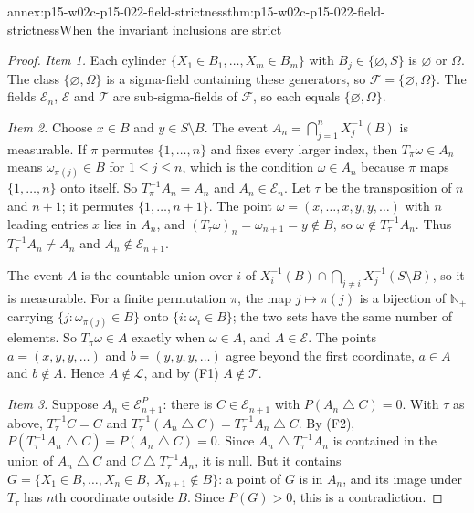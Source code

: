 \begin{annexitem}{annex:p15-w02c-p15-022-field-strictness}{thm:p15-w02c-p15-022-field-strictness}{When the invariant inclusions are strict}
\begin{proof}
\emph{Item 1.} Each cylinder \(\{X_1\in B_1,\ldots,X_m\in B_m\}\) with
\(B_j\in\{\varnothing,S\}\) is \(\varnothing\) or \(\Omega\). The class
\(\{\varnothing,\Omega\}\) is a sigma-field containing these
generators, so \(\mathcal F=\{\varnothing,\Omega\}\). The fields
\(\mathcal E_n\), \(\mathcal E\) and \(\mathcal T\) are sub-sigma-fields
of \(\mathcal F\), so each equals \(\{\varnothing,\Omega\}\).

\emph{Item 2.} Choose \(x\in B\) and \(y\in S\setminus B\). The event
\(A_n=\bigcap_{j=1}^nX_j^{-1}(B)\) is measurable. If \(\pi\) permutes
\(\{1,\ldots,n\}\) and fixes every larger index, then
\(T_\pi\omega\in A_n\) means \(\omega_{\pi(j)}\in B\) for \(1\leq j\leq n\),
which is the condition \(\omega\in A_n\) because \(\pi\) maps
\(\{1,\ldots,n\}\) onto itself. So \(T_\pi^{-1}A_n=A_n\) and
\(A_n\in\mathcal E_n\). Let \(\tau\) be the transposition of \(n\) and
\(n+1\); it permutes \(\{1,\ldots,n+1\}\). The point
\(\omega=(x,\ldots,x,y,y,\ldots)\) with \(n\) leading entries \(x\) lies
in \(A_n\), and \((T_\tau\omega)_n=\omega_{n+1}=y\notin B\), so
\(\omega\notin T_\tau^{-1}A_n\). Thus \(T_\tau^{-1}A_n\neq A_n\) and
\(A_n\notin\mathcal E_{n+1}\).

The event \(A\) is the countable union over \(i\) of
\(X_i^{-1}(B)\cap\bigcap_{j\neq i}X_j^{-1}(S\setminus B)\), so it is
measurable. For a finite permutation \(\pi\), the map \(j\mapsto\pi(j)\)
is a bijection of \(\mathbb N_+\) carrying
\(\{j:\omega_{\pi(j)}\in B\}\) onto \(\{i:\omega_i\in B\}\); the two sets
have the same number of elements. So \(T_\pi\omega\in A\) exactly when
\(\omega\in A\), and \(A\in\mathcal E\). The points
\(a=(x,y,y,\ldots)\) and \(b=(y,y,y,\ldots)\) agree beyond the first
coordinate, \(a\in A\) and \(b\notin A\). Hence \(A\notin\mathcal L\), and
by (F1) \(A\notin\mathcal T\).

\emph{Item 3.} Suppose \(A_n\in\mathcal E_{n+1}^{P}\): there is
\(C\in\mathcal E_{n+1}\) with \(P(A_n\mathbin{\triangle}C)=0\). With
\(\tau\) as above, \(T_\tau^{-1}C=C\) and
\(T_\tau^{-1}(A_n\mathbin{\triangle}C)
 =T_\tau^{-1}A_n\mathbin{\triangle}C\). By (F2),
\(P(T_\tau^{-1}A_n\mathbin{\triangle}C)=P(A_n\mathbin{\triangle}C)=0\).
Since \(A_n\mathbin{\triangle}T_\tau^{-1}A_n\) is contained in the union
of \(A_n\mathbin{\triangle}C\) and \(C\mathbin{\triangle}T_\tau^{-1}A_n\),
it is null. But it contains
\(G=\{X_1\in B,\ldots,X_n\in B,\ X_{n+1}\notin B\}\): a point of \(G\)
is in \(A_n\), and its image under \(T_\tau\) has \(n\)th coordinate
outside \(B\). Since \(P(G)>0\), this is a contradiction.


\end{proof}
\end{annexitem}

